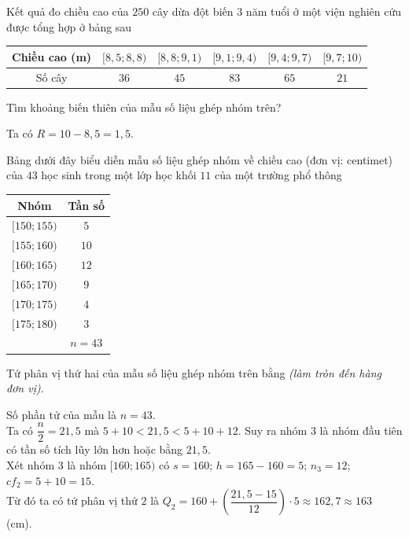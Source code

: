 \begin{ex}%
	Kết quả đo chiều cao của $250$ cây dừa đột biến $3$ năm tuổi ở một viện nghiên cứu được tổng hợp ở bảng sau
	\begin{center}
		\begin{tabular}{|c|c|c|c|c|c|}
			\hline
			Chiều cao (m) & $[8{,}5;8{,}8)$ & $[8{,}8;9{,}1)$ & $[9{,}1;9{,}4)$ & $[9{,}4;9{,}7)$ & $[9{,}7;10)$ \\
			\hline
			Số cây & $36$ & $45$ & $83$ & $65$ & $21$ \\
			\hline
		\end{tabular}	
	\end{center}
	Tìm khoảng biến thiên của mẫu số liệu ghép nhóm trên?
	
	\loigiai
	{
		Ta có $R=10-8{,}5=1{,}5$.
	}
\end{ex}

\begin{ex}%
	Bảng dưới đây biểu diễn mẫu số liệu ghép nhóm về chiều cao (đơn vị: centimet) của $43$ học sinh trong một lớp học khối $11$ của một trường phổ thông 
	\begin{center}
		\begin{tabular}{|c|c|}
			\hline
			Nhóm & Tần số \\
			\hline
			$[150;155)$ & $5$ \\
			\hline
			$[155;160)$ & $10$ \\
			\hline
			$[160;165)$ & $12$ \\
			\hline
			$[165;170)$ & $9$ \\
			\hline
			$[170;175)$ & $4$ \\
			\hline
			$[175;180)$ & $3$ \\
			\hline
			& $n=43$ \\
			\hline
		\end{tabular}
	\end{center}	
	Tứ phân vị thứ hai của mẫu số liệu ghép nhóm trên bằng \textit{(làm tròn đến hàng đơn vị)}.
	
	\loigiai
	{
		Số phần tử của mẫu là $n=43$.\\
		Ta có $\dfrac{n}{2}=21{,}5$ mà $5+10< 21{,}5< 5+10+12$. Suy ra nhóm $3$ là nhóm đầu tiên có tần số tích lũy lớn hơn hoặc bằng $21{,}5$.\\
		Xét nhóm $3$ là nhóm $[160;165)$ có $s=160$; $h=165-160=5$; $n_3=12$; $cf_2=5+10=15$.\\
		Từ đó ta có tứ phân vị thứ $2$ là  $Q_2=160+\left(\dfrac{21{,}5-15}{12} \right)\cdot 5\approx 162{,}7\approx 163$ \,(cm).
	}
\end{ex}


